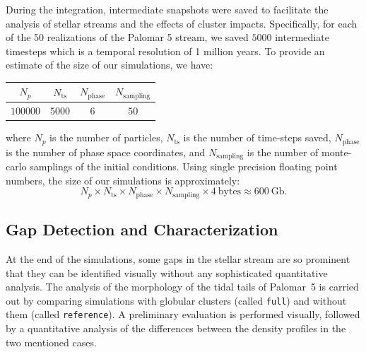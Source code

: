 \documentclass{aa}
\begin{document}
    During the integration, intermediate snapshots were saved to facilitate the analysis of stellar streams and the effects of cluster impacts. Specifically, for each of the 50 realizations of the Palomar 5 stream, we saved $5000$ intermediate timesteps which is a temporal resolution of 1 million years. To provide an estimate of the size of our simulations, we have:
    \begin{tabular}{c|c|c|c}
      $N_p$ & $N_{\textrm{ts}}$ & $N_{\textrm{phase}}$ & $N_{\textrm{sampling}}$  \\
      \hline
      $100000$ & $5000$ & $6$ & $50$   \\
    \end{tabular} 
    where $N_p$  is the number of particles, $N_{\textrm{ts}}$ is the number of time-steps saved, $N_{\textrm{phase}}$ is the number of phase space coordinates, and $N_{\textrm{sampling}}$ is the number of monte-carlo samplings of the initial conditions. Using single precision floating point numbers, the size of our simulations is approximately:
    \begin{equation} \label{eq:data_volume_estimate}
      N_p \times N_{\textrm{ts}}\times N_{\textrm{phase}}\times N_{\textrm{sampling}} \times 4~\textrm{bytes}\approx 600~\textrm{Gb}.
    \end{equation}




  \subsection{Gap Detection and Characterization} \label{sec:gap_methods}

    At the end of the simulations, some gaps in the stellar stream are so prominent that they can be identified visually without any sophisticated quantitative analysis. The analysis of the morphology of the tidal tails of Palomar~5 is carried out by comparing simulations with globular clusters (called \texttt{full}) and without them (called \texttt{reference}). A preliminary evaluation is performed visually, followed by a quantitative analysis of the differences between the density profiles in the two mentioned cases. 


\end{document}

